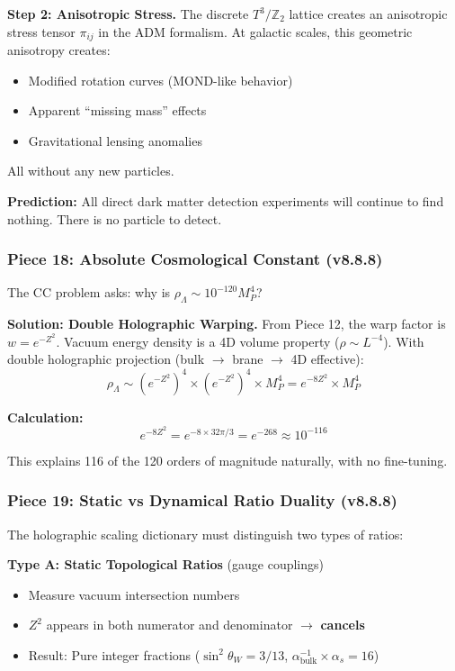 \documentclass[12pt,a4paper]{article}
\newcommand{\Ztwo}{\mathbb{Z}_2}
\newcommand{\Tthree}{T^3}
\newcommand{\sinW}{\sin^2\theta_W}
\newcommand{\Zsq}{Z^2}
\begin{document}
\textbf{Step 2: Anisotropic Stress.}
The discrete $\Tthree/\Ztwo$ lattice creates an anisotropic stress tensor $\pi_{ij}$ in the ADM formalism. At galactic scales, this geometric anisotropy creates:
\begin{itemize}[itemsep=0pt]
    \item Modified rotation curves (MOND-like behavior)
    \item Apparent ``missing mass'' effects
    \item Gravitational lensing anomalies
\end{itemize}
All without any new particles.

\textbf{Prediction:} All direct dark matter detection experiments will continue to find nothing. There is no particle to detect.

\subsubsection{Piece 18: Absolute Cosmological Constant (v8.8.8)}

The CC problem asks: why is $\rho_\Lambda \sim 10^{-120} M_P^4$?

\textbf{Solution: Double Holographic Warping.}
From Piece 12, the warp factor is $w = e^{-\Zsq}$. Vacuum energy density is a 4D volume property ($\rho \sim L^{-4}$). With double holographic projection (bulk $\to$ brane $\to$ 4D effective):
\begin{equation}
\boxed{
\rho_\Lambda \sim (e^{-\Zsq})^4 \times (e^{-\Zsq})^4 \times M_P^4 = e^{-8\Zsq} \times M_P^4
}
\end{equation}

\textbf{Calculation:}
\begin{equation}
e^{-8\Zsq} = e^{-8 \times 32\pi/3} = e^{-268} \approx 10^{-116}
\end{equation}

This explains 116 of the 120 orders of magnitude naturally, with no fine-tuning.

\subsubsection{Piece 19: Static vs Dynamical Ratio Duality (v8.8.8)}

The holographic scaling dictionary must distinguish two types of ratios:

\textbf{Type A: Static Topological Ratios} (gauge couplings)
\begin{itemize}[itemsep=0pt]
    \item Measure vacuum intersection numbers
    \item $\Zsq$ appears in both numerator and denominator $\to$ \textbf{cancels}
    \item Result: Pure integer fractions ($\sinW = 3/13$, $\alpha_{\text{bulk}}^{-1} \times \alpha_s = 16$)
\end{itemize}
\end{document}
